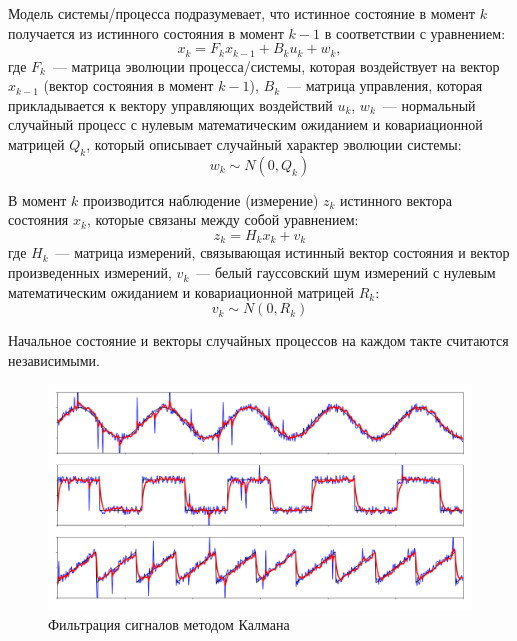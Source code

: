 Модель системы/процесса подразумевает, что истинное состояние в момент $k$ получается из истинного состояния в момент $k-1$ в соответствии с уравнением:
\begin{equation}
	x_{k} = {F}_{k} {x}_{k-1} + {B}_{k} {u}_{k} + {w}_{k},
\end{equation}
где $F_k$ — матрица эволюции процесса/системы, которая воздействует на вектор $x_{k-1}$ (вектор состояния в момент $k-1$), $B_k$ — матрица управления, которая прикладывается к вектору управляющих воздействий $u_k$, $w_k$ — нормальный случайный процесс с нулевым математическим ожиданием и ковариационной матрицей $Q_k$, который описывает случайный характер эволюции системы:
\begin{equation}
	 {w}_{k} \sim N(0, {Q}_k)
\end{equation}

В момент $k$ производится наблюдение (измерение) $z_k$ истинного вектора состояния $x_k$, которые связаны между собой уравнением:
\begin{equation}
	{z}_{k} = {H}_{k} {x}_{k} + {v}_{k} 
\end{equation}
где $H_k$ --- матрица измерений, связывающая истинный вектор состояния и вектор произведенных измерений, $v_k$ --- белый гауссовский шум измерений с нулевым математическим ожиданием и ковариационной матрицей $R_k$:
\begin{equation}
	{v}_{k} \sim N(0, {R}_k) 
\end{equation}

Начальное состояние и векторы случайных процессов на каждом такте считаются независимыми. \cite{calman3}

\begin{figure}[h]
	\begin{center}
		\includegraphics[pages=-, scale=0.40]{./inc/img/8.png}
		\caption{Фильтрация сигналов методом Калмана}  
		\label{img_8}
	\end{center}
\end{figure}

